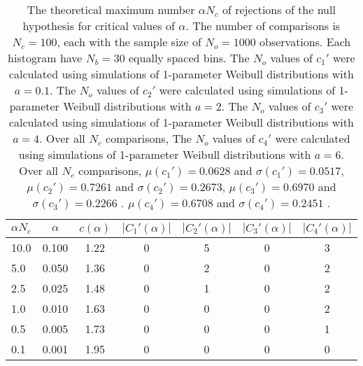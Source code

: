 \begin{table}[h!]
\begin{center}
\begin{tabular}{| l | c | c | c | c | c | c |}\hline
$\alpha N_c$ & $\alpha$ & $c(\alpha)$ & $|C_1'(\alpha)|$ & $|C_2'(\alpha)|$ & $|C_3'(\alpha)|$ & $|C_4'(\alpha)|$ \\\hline
10.0 & 0.100 & 1.22 & 0 & 5 & 0 & 3 \\\hline
5.0 & 0.050 & 1.36 & 0 & 2 & 0 & 2 \\\hline
2.5 & 0.025 & 1.48 & 0 & 1 & 0 & 2 \\\hline
1.0 & 0.010 & 1.63 & 0 & 0 & 0 & 2 \\\hline
0.5 & 0.005 & 1.73 & 0 & 0 & 0 & 1 \\\hline
0.1 & 0.001 & 1.95 & 0 & 0 & 0 & 0 \\\hline
\end{tabular}
\caption{The theoretical maximum number $\alpha N_c$ of rejections
of the null hypothesis for critical values of $\alpha$.
The number of comparisons is $N_c=100$,
each with the sample size of $N_o=1000$ observations.
Each histogram have $N_b=30$ equally spaced bins.
The $N_o$ values of $c_1'$ were calculated using simulations of
 1-parameter Weibull distributions with $a=0.1$.
The $N_o$ values of $c_2'$ were calculated using simulations of
 1-parameter Weibull distributions with $a=2$.
The $N_o$ values of $c_3'$ were calculated using simulations of
 1-parameter Weibull distributions with $a=4$.
Over all $N_c$ comparisons,
The $N_o$ values of $c_4'$ were calculated using simulations of
 1-parameter Weibull distributions with $a=6$.
Over all $N_c$ comparisons,
 $\mu(c_1')=0.0628$ and $\sigma(c_1')=0.0517$,
 $\mu(c_2')=0.7261$ and $\sigma(c_2')=0.2673$,
 $\mu(c_3')=0.6970$ and $\sigma(c_3')=0.2266$ .
 $\mu(c_4')=0.6708$ and $\sigma(c_4')=0.2451$ .
}
\end{center}
\end{table}